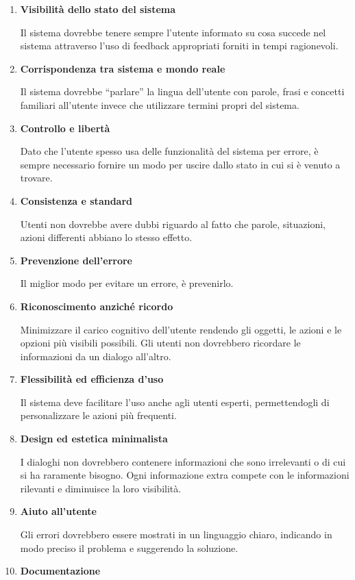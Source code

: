 \documentclass[12pt,italian,]{report}
\begin{document}
\begin{enumerate}
\def\labelenumi{\arabic{enumi}.}
\item
  \textbf{Visibilità dello stato del sistema}

  Il sistema dovrebbe tenere sempre l'utente informato su cosa succede
  nel sistema attraverso l'uso di feedback appropriati forniti in tempi
  ragionevoli.
\item
  \textbf{Corrispondenza tra sistema e mondo reale}

  Il sistema dovrebbe ``parlare'' la lingua dell'utente con parole,
  frasi e concetti familiari all'utente invece che utilizzare termini
  propri del sistema.
\item
  \textbf{Controllo e libertà}

  Dato che l'utente spesso usa delle funzionalità del sistema per
  errore, è sempre necessario fornire un modo per uscire dallo stato in
  cui si è venuto a trovare.
\item
  \textbf{Consistenza e standard}

  Utenti non dovrebbe avere dubbi riguardo al fatto che parole,
  situazioni, azioni differenti abbiano lo stesso effetto.
\item
  \textbf{Prevenzione dell'errore}

  Il miglior modo per evitare un errore, è prevenirlo.
\item
  \textbf{Riconoscimento anziché ricordo}

  Minimizzare il carico cognitivo dell'utente rendendo gli oggetti, le
  azioni e le opzioni più visibili possibili. Gli utenti non dovrebbero
  ricordare le informazioni da un dialogo all'altro.
\item
  \textbf{Flessibilità ed efficienza d'uso}

  Il sistema deve facilitare l'uso anche agli utenti esperti,
  permettendogli di personalizzare le azioni più frequenti.
\item
  \textbf{Design ed estetica minimalista}

  I dialoghi non dovrebbero contenere informazioni che sono irrelevanti
  o di cui si ha raramente bisogno. Ogni informazione extra compete con
  le informazioni rilevanti e diminuisce la loro visibilità.
\item
  \textbf{Aiuto all'utente}

  Gli errori dovrebbero essere mostrati in un linguaggio chiaro,
  indicando in modo preciso il problema e suggerendo la soluzione.
\item
  \textbf{Documentazione}
\end{enumerate}
\end{document}
